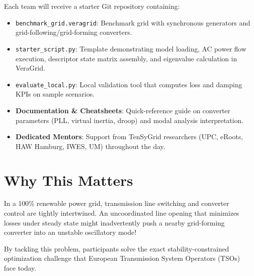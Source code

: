 \documentclass[11pt,a4paper]{article}
\begin{document}
Each team will receive a starter Git repository containing:
\begin{itemize}[leftmargin=*, itemsep=2pt]
  \item \texttt{benchmark\_grid.veragrid}: Benchmark grid with synchronous generators and grid-following/grid-forming converters.
  \item \texttt{starter\_script.py}: Template demonstrating model loading, AC power flow execution, descriptor state matrix assembly, and eigenvalue calculation in VeraGrid.
  \item \texttt{evaluate\_local.py}: Local validation tool that computes loss and damping KPIs on sample scenarios.
  \item \textbf{Documentation \& Cheatsheets}: Quick-reference guide on converter parameters (PLL, virtual inertia, droop) and modal analysis interpretation.
  \item \textbf{Dedicated Mentors}: Support from TenSyGrid researchers (UPC, eRoots, HAW Hamburg, IWES, UM) throughout the day.
\end{itemize}

\section{Why This Matters}

In a 100\% renewable power grid, transmission line switching and converter control are tightly intertwined. An uncoordinated line opening that minimizes losses under steady state might inadvertently push a nearby grid-forming converter into an unstable oscillatory mode!

By tackling this problem, participants solve the exact stability-constrained optimization challenge that European Transmission System Operators (TSOs) face today.
\end{document}
